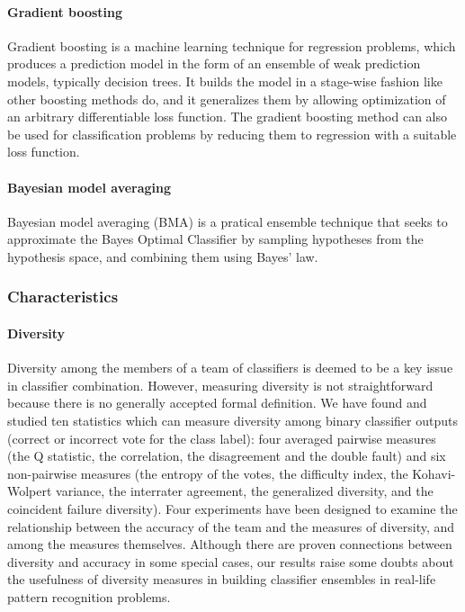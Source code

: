 \paragraph{Gradient boosting}
\label{sec:ml:GradientBoosting}
Gradient boosting \cite{friedman2001greedy} is a machine learning technique for regression problems, which produces a prediction model in the form of an ensemble of weak prediction models, typically decision trees. It builds the model in a stage-wise fashion like other boosting methods do, and it generalizes them by allowing optimization of an arbitrary differentiable loss function. The gradient boosting method can also be used for classification problems by reducing them to regression with a suitable loss function.

\paragraph{Bayesian model averaging}

Bayesian model averaging (BMA) \cite{hoeting1999bayesian}  is a pratical ensemble technique that seeks to approximate the Bayes Optimal Classifier by sampling hypotheses from the hypothesis space, and combining them using Bayes' law.

\subsubsection{Characteristics}

\paragraph{Diversity}

\cite{kuncheva2003measures} Diversity among the members of a team of classifiers is deemed to be a key issue in classifier
combination. However, measuring diversity is not straightforward because there is no generally accepted formal
definition. We have found and studied ten statistics which can measure diversity among binary classifier outputs
(correct or incorrect vote for the class label): four averaged pairwise measures (the Q statistic, the correlation,
the disagreement and the double fault) and six non-pairwise measures (the entropy of the votes, the difficulty
index, the Kohavi-Wolpert variance, the interrater agreement, the generalized diversity, and the coincident failure
diversity). Four experiments have been designed to examine the relationship between the accuracy of the team and
the measures of diversity, and among the measures themselves. Although there are proven connections between
diversity and accuracy in some special cases, our results raise some doubts about the usefulness of diversity
measures in building classifier ensembles in real-life pattern recognition problems.


